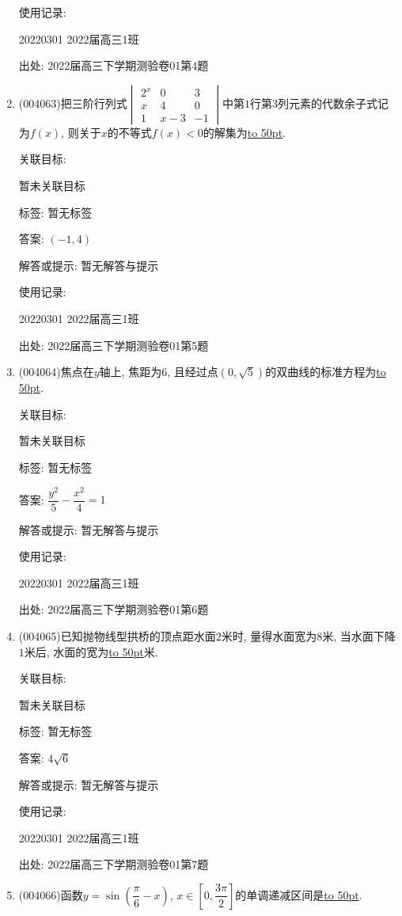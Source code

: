 \documentclass[10pt,a4paper]{article}
\newcommand{\blank}[1]{\underline{\hbox to #1pt{}}}
\begin{document}
\begin{enumerate}[1.]
使用记录:

20220301	2022届高三1班	


出处: 2022届高三下学期测验卷01第4题
\item { (004063)}把三阶行列式$\begin{vmatrix} 2^x & 0 & 3  \\x & 4 & 0  \\1 & x-3 & -1  \end{vmatrix}$中第$1$行第$3$列元素的代数余子式记为$f(x)$, 则关于$x$的不等式$f(x)<0$的解集为\blank{50}.


关联目标:

暂未关联目标



标签: 暂无标签

答案: $(-1,4)$

解答或提示: 暂无解答与提示

使用记录:

20220301	2022届高三1班	


出处: 2022届高三下学期测验卷01第5题
\item { (004064)}焦点在$y$轴上, 焦距为$6$, 且经过点$(0,\sqrt 5)$的双曲线的标准方程为\blank{50}.


关联目标:

暂未关联目标



标签: 暂无标签

答案: $\dfrac{y^2}{5}-\dfrac{x^2}{4}=1$

解答或提示: 暂无解答与提示

使用记录:

20220301	2022届高三1班	


出处: 2022届高三下学期测验卷01第6题
\item { (004065)}已知抛物线型拱桥的顶点距水面$2$米时, 量得水面宽为$8$米, 当水面下降$1$米后, 水面的宽为\blank{50}米.


关联目标:

暂未关联目标



标签: 暂无标签

答案: $4\sqrt{6}$

解答或提示: 暂无解答与提示

使用记录:

20220301	2022届高三1班	


出处: 2022届高三下学期测验卷01第7题
\item { (004066)}函数$y=\sin (\dfrac{\pi}6-x)$, $x\in [0,\dfrac{3\pi }2]$的单调递减区间是\blank{50}.



\end{enumerate}
\end{document}
